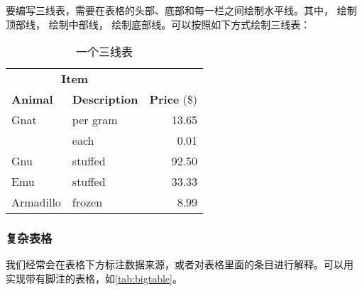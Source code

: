 要编写三线表，需要在表格的头部、底部和每一栏之间绘制水平线。其中， 绘制顶部线， 绘制中部线， 绘制底部线。可以按照如下方式绘制三线表：
\begin{table}[!hpt]
  \caption{一个三线表}
  \label{tab:firstone}
  \centering
  \begin{tabular}{@{}llr@{}} \toprule
    \multicolumn{2}{c}{\textbf{Item}}                            \\ \cmidrule(r){1-2}
    \textbf{Animal} & \textbf{Description} & \textbf{Price} (\$) \\ \midrule
    Gnat            & per gram             & 13.65               \\
                    & each                 & 0.01                \\
    Gnu             & stuffed              & 92.50               \\
    Emu             & stuffed              & 33.33               \\
    Armadillo       & frozen               & 8.99                \\ \bottomrule
  \end{tabular}
\end{table}

\subsubsection{复杂表格}

我们经常会在表格下方标注数据来源，或者对表格里面的条目进行解释。可以用
 实现带有脚注的表格，如\cref{tab:bigtable}。

